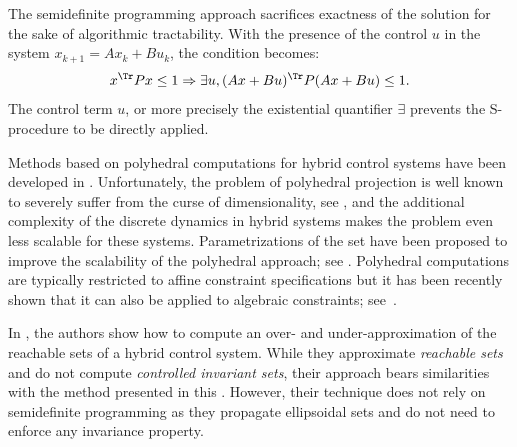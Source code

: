 \documentclass[11pt,twoside,a4paper,openright]{uclouvain-thesis}
\begin{document}
The semidefinite programming approach sacrifices exactness of the solution for the sake of algorithmic tractability.
With the presence of the control $u$ in the system $x_{k+1} = Ax_k + Bu_k$, the condition becomes:
\begin{equation}
  \label{eq:disc_existential}
  x^\Tr P x \leq 1 \Rightarrow \exists u, (A x + Bu)^\Tr P (A x + Bu) \leq 1.
\end{equation}
The control term $u$, or more precisely the existential quantifier $\exists$ prevents the S-procedure to be directly applied.

Methods based on polyhedral computations for hybrid control systems have been developed in \cite{rungger2013specification, smith2016interdependence, rungger2017computing}.
Unfortunately, the problem of polyhedral projection is well known to severely suffer from the curse of dimensionality, see \cite{avis1995good}, and the additional complexity of the discrete dynamics in hybrid systems makes the problem even less scalable for these systems.
Parametrizations of the set have been proposed to improve the scalability of the polyhedral approach; see \cite{rakovic2010parameterized}.
Polyhedral computations are typically restricted to affine constraint
specifications but it has been recently shown that it can also be applied to
algebraic constraints; see~\cite{athanasopoulos2016computing}.

In \cite{kurzhanski2005verification}, the authors show how to compute an over- and under-approximation of the reachable sets of a hybrid control system.
While they approximate \emph{reachable sets} and do not compute \emph{controlled invariant sets}, their approach bears similarities with the method presented in this .
However, their technique does not rely on semidefinite programming as they propagate ellipsoidal sets and do not need to enforce any invariance property.
\end{document}
